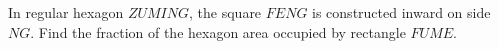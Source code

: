 In regular hexagon $ZUMING$, the square $FENG$ is constructed inward on side $NG$. Find the fraction of the hexagon area occupied by rectangle $FUME$.
